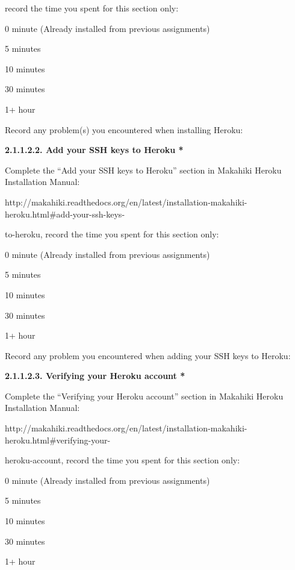 record the time you spent for this section only:

\begin{radiobutton}
\item 0 minute (Already installed from previous assignments)
\item 5 minutes
\item  10 minutes
\item  30 minutes
\item  1+ hour
\end{radiobutton}

Record any problem(s) you encountered when installing Heroku: \underline{\hspace{4cm}}

{\bf 2.1.1.2.2. Add your SSH keys to Heroku *}

Complete the ``Add your SSH keys to Heroku'' section in Makahiki Heroku Installation Manual:

http://makahiki.readthedocs.org/en/latest/installation-makahiki-heroku.html\#add-your-ssh-keys-

to-heroku, record the time you spent for this section only:

\begin{radiobutton}
\item 0 minute (Already installed from previous assignments)
\item 5 minutes
\item  10 minutes
\item  30 minutes
\item  1+ hour
\end{radiobutton}

Record any problem you encountered when adding your SSH keys to Heroku: \underline{\hspace{3cm}}

{\bf 2.1.1.2.3. Verifying your Heroku account *}

Complete the ``Verifying your Heroku account'' section in Makahiki Heroku Installation Manual:

http://makahiki.readthedocs.org/en/latest/installation-makahiki-heroku.html\#verifying-your-

heroku-account,  record the time you spent for this section only:

\begin{radiobutton}
\item 0 minute (Already installed from previous assignments)
\item 5 minutes
\item  10 minutes
\item  30 minutes
\item  1+ hour
\end{radiobutton}

